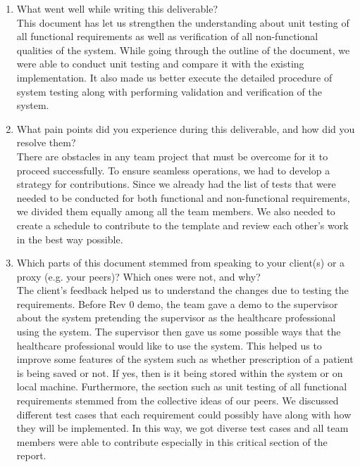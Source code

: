 \documentclass[12pt, titlepage]{article}
\begin{document}
\begin{enumerate}
  \item What went well while writing this deliverable?\\
  This document has let us strengthen the understanding about unit testing of all functional requirements as well as verification of all non-functional qualities of the system. While going through the outline of the document, we were able to conduct unit testing and compare it with the existing implementation. It also made us better execute the detailed procedure of system testing along with performing validation and verification of the system. 

  \item What pain points did you experience during this deliverable, and how did you resolve them?\\
  There are obstacles in any team project that must be overcome for it to proceed successfully. To ensure seamless operations, we had to develop a strategy for contributions. Since we already had the list of tests that were needed to be conducted for both functional and non-functional requirements, we divided them equally among all the team members. We also needed to create a schedule to contribute to the template and review each other's work in the best way possible. 

  \item Which parts of this document stemmed from speaking to your client(s) or a proxy (e.g. your peers)? Which ones were not, and why?\\
  The client's feedback helped us to understand the changes due to testing the requirements. Before Rev 0 demo, the team gave a demo to the supervisor about the system pretending the supervisor as the healthcare professional using the system. The supervisor then gave us some possible ways that the healthcare professional would like to use the system. This helped us to improve some features of the system such as whether prescription of a patient is being saved or not. If yes, then is it being stored within the system or on local machine. Furthermore, the section such as unit testing of all functional requirements stemmed from the collective ideas of our peers. We discussed different test cases that each requirement could possibly have along with how they will be implemented. In this way, we got diverse test cases and all team members were able to contribute especially in this critical section of the report.


\end{enumerate}
\end{document}
